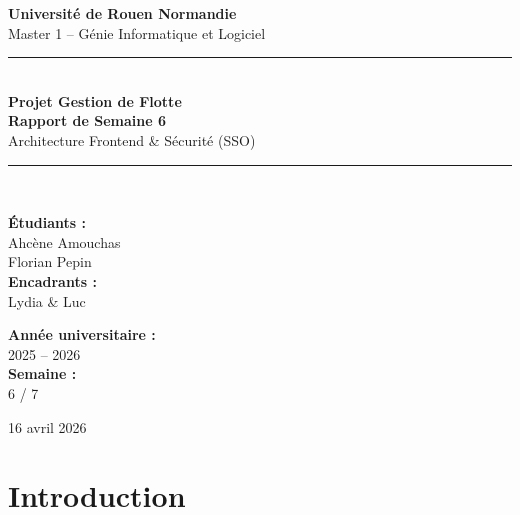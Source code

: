 \documentclass[12pt,a4paper]{article}
\begin{document}
\begin{titlepage}
  \centering
  \vspace*{1cm}

  {\Large\textbf{Universit\'{e} de Rouen Normandie}\\[0.3cm]
  \large Master 1 -- G\'{e}nie Informatique et Logiciel}

  \vspace{1.5cm}
  {\color{primary!55}\rule{\linewidth}{0.5mm}}\\[0.45cm]

  {\Huge\sffamily\bfseries\color{primary} Projet Gestion de Flotte\\[0.35cm]}
  {\LARGE\sffamily\bfseries\color{primary!80!black} Rapport de Semaine 6}\\[0.35cm]
  {\large\sffamily\color{primary!65!black} Architecture Frontend \& S\'{e}curit\'{e} (SSO)}

  {\color{primary!55}\rule{\linewidth}{0.5mm}}\\[1.5cm]

  \begin{minipage}{0.45\textwidth}
    \begin{flushleft}
      \textbf{\'{E}tudiants :}\\
      Ahc\`{e}ne Amouchas \\
      Florian Pepin \\[0.5cm]
      \textbf{Encadrants :}\\
      Lydia \& Luc
    \end{flushleft}
  \end{minipage}
  \hfill
  \begin{minipage}{0.45\textwidth}
    \begin{flushright}
      \textbf{Ann\'{e}e universitaire :}\\
      2025 -- 2026 \\[0.5cm]
      \textbf{Semaine :}\\
      6 / 7
    \end{flushright}
  \end{minipage}

  \vfill
  {\large 16 avril 2026}
\end{titlepage}

\tableofcontents
\newpage

\section{Introduction}
\end{document}
